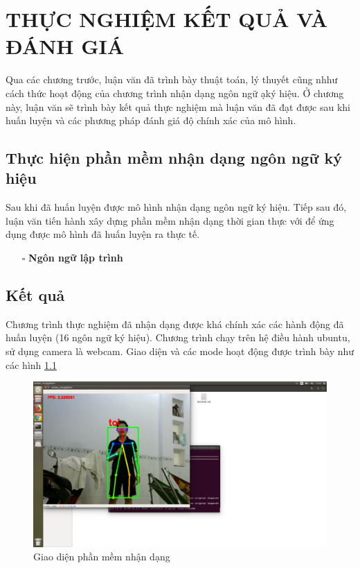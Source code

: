 \chapter{THỰC NGHIỆM KẾT QUẢ VÀ ĐÁNH GIÁ}
Qua các chương trước, luận văn đã trình bày thuật toán, lý thuyết cũng nhhư cách thức hoạt động của chương trình nhận dạng ngôn ngữ ạký hiệu. Ở chương này, luận văn sẽ trình bày kết quả thực nghiệm mà luận văn đã đạt được sau khi huấn luyện và các phương pháp đánh giá độ chính xác của mô hình.
\section{Thực hiện phần mềm nhận dạng ngôn ngữ ký hiệu}
Sau khi đã huấn luyện được mô hình nhận dạng ngôn ngữ ký hiệu. Tiếp sau đó, luận văn tiến hành xây dựng phần mềm nhận dạng thời gian thực với để ứng dụng được mô hình đã huấn luyện ra thực tế.
\begin{itemize}
\item[$\square$] \textbf{Ngôn ngữ lập trình}

\end{itemize}


\section{Kết quả}
Chương trình thực nghiệm đã nhận dạng được khá chính xác các hành động đã huấn luyện (16 ngôn ngữ ký hiệu). Chương trình chạy trên hệ điều hành ubuntu, sử dụng camera là webcam. Giao diện và các mode hoạt động được trình bày như các hình \ref{fig:gui}

\FloatBarrier
\begin{figure}[htp]
\begin{center}
\includegraphics[scale=0.25]{chap5/c5_figs/1.png}
\end{center}
\caption{Giao diện phần mềm nhận dạng}
\label{fig:gui}
\end{figure}
\FloatBarrier

